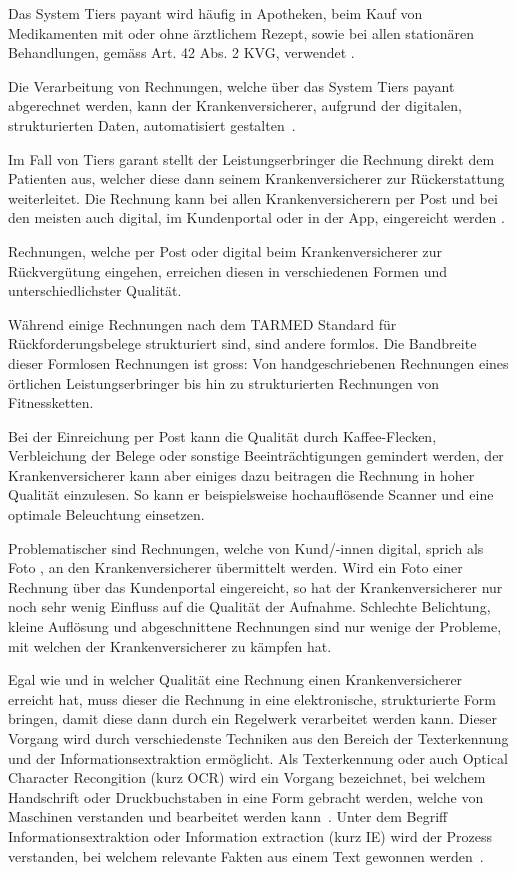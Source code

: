 Das System Tiers payant wird häufig in Apotheken, beim Kauf von Medikamenten mit oder ohne ärztlichem Rezept, sowie bei allen stationären Behandlungen, gemäss Art. 42 Abs. 2 KVG, verwendet \autocite{EDI2017}.

Die Verarbeitung von Rechnungen, welche über das System Tiers payant abgerechnet werden, kann der Krankenversicherer, aufgrund der digitalen, strukturierten Daten, automatisiert gestalten~\autocite{BAG2016}.

Im Fall von Tiers garant stellt der Leistungserbringer die Rechnung direkt dem Patienten aus, welcher diese dann seinem Krankenversicherer zur Rückerstattung weiterleitet. Die Rechnung kann bei allen Krankenversicherern per Post und bei den meisten auch digital, im Kundenportal oder in der App, eingereicht werden \autocite{EDI2017}.

Rechnungen, welche per Post oder digital beim Krankenversicherer zur Rückvergütung eingehen, erreichen diesen in verschiedenen Formen und unterschiedlichster Qualität. 

Während einige Rechnungen nach dem TARMED Standard für Rückforderungsbelege strukturiert sind, sind andere formlos. Die Bandbreite dieser Formlosen Rechnungen ist gross: Von handgeschriebenen Rechnungen eines örtlichen Leistungserbringer bis hin zu strukturierten Rechnungen von Fitnessketten.

Bei der Einreichung per Post kann die Qualität durch Kaffee-Flecken, Verbleichung der Belege oder sonstige Beeinträchtigungen gemindert werden, der Krankenversicherer kann aber einiges dazu beitragen die Rechnung in hoher Qualität einzulesen. So kann er beispielsweise hochauflösende Scanner und eine optimale Beleuchtung einsetzen.

Problematischer sind Rechnungen, welche von Kund/-innen digital, sprich als Foto , an den Krankenversicherer übermittelt werden. Wird ein Foto einer Rechnung über das Kundenportal eingereicht, so hat der Krankenversicherer nur noch sehr wenig Einfluss auf die Qualität der Aufnahme. Schlechte Belichtung, kleine Auflösung und abgeschnittene Rechnungen sind nur wenige der Probleme, mit welchen der Krankenversicherer zu kämpfen hat.

Egal wie und in welcher Qualität eine Rechnung einen Krankenversicherer erreicht hat, muss dieser die Rechnung in eine elektronische, strukturierte Form bringen, damit diese dann durch ein Regelwerk verarbeitet werden kann. Dieser Vorgang wird durch verschiedenste Techniken aus den Bereich der Texterkennung und der Informationsextraktion ermöglicht. Als Texterkennung oder auch Optical Character Recongition (kurz OCR) wird ein Vorgang bezeichnet, bei welchem Handschrift oder Druckbuchstaben in eine Form gebracht werden, welche von Maschinen verstanden und bearbeitet werden kann~\autocite{Xue2014}. Unter dem Begriff Informationsextraktion oder Information extraction (kurz IE) wird der Prozess verstanden, bei welchem relevante Fakten aus einem Text gewonnen werden~\autocite{Piskorski2012}.

